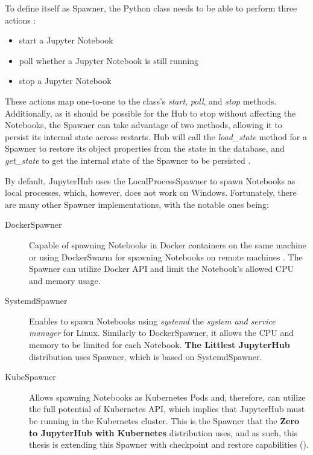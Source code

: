 \documentclass[
  digital,     %
  oneside,     %
  nosansbold,  %
  nocolorbold, %
  lof,         %
  nolot,         %
]{fithesis4}
\begin{document}
To define itself as Spawner, the Python class needs to be able to perform three actions \cite{jupyterhub_spawner}:
\begin{itemize}
  \item start a Jupyter Notebook
  \item poll whether a Jupyter Notebook is still running
  \item stop a Jupyter Notebook
\end{itemize}
These actions map one-to-one to the class's \emph{start}, \emph{poll}, and \emph{stop} methods. Additionally, as it should be possible for the Hub to stop without affecting the Notebooks, the Spawner can take advantage of two methods, allowing it to persist its internal state across restarts. Hub will call the \emph{load\_state} method for a Spawner to restore its object properties from the state in the database, and \emph{get\_state} to get the internal state of the Spawner to be persisted \cite{jupyterhub_spawner}.

By default, JupyterHub uses the LocalProcessSpawner to spawn Notebooks as local processes, which, however, does not work on Windows. Fortunately, there are many other Spawner implementations, with the notable ones being:
\begin{description}

    \item[DockerSpawner] Capable of spawning Notebooks in Docker containers on the same machine or using DockerSwarm for spawning Notebooks on remote machines \cite{jupyterhub_spawner}. The Spawner can utilize Docker API and limit the Notebook's allowed CPU and memory usage.
    
    \item[SystemdSpawner]
    Enables to spawn Notebooks using \emph{systemd} the \emph{system and service manager} \cite{systemd} for Linux. Similarly to DockerSpawner, it allows the CPU and memory to be limited for each Notebook. \textbf{The Littlest JupyterHub} distribution uses Spawner, which is based on SystemdSpawner.


    \item[KubeSpawner]
    Allows spawning Notebooks as Kubernetes Pods and, therefore, can utilize the full potential of Kubernetes API, which implies that JupyterHub must be running in the Kubernetes cluster. This is the Spawner that the \textbf{Zero to JupyterHub with Kubernetes} distribution uses, and as such, this thesis is extending this Spawner with checkpoint and restore capabilities ().
    
\end{description}
\end{document}
